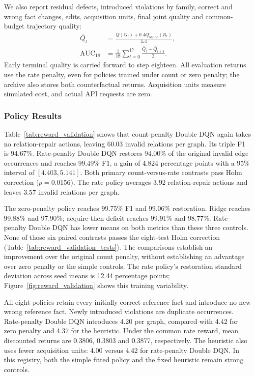 We also report residual defects, introduced violations by family, correct and wrong fact changes, edits, acquisition units, final joint quality and common-budget trajectory quality:
\begin{equation}
\begin{aligned}
\bar Q_t&=\frac{Q(G_t)+0.4Q_{\mathrm{online}}(R_t)}{1.4},\\
\mathrm{AUC}_{18}&=\frac1{18}\sum_{t=0}^{17}\frac{\bar Q_t+\bar Q_{t+1}}2.
\end{aligned}
\end{equation}
Early terminal quality is carried forward to step eighteen. All evaluation returns use the rate penalty, even for policies trained under count or zero penalty; the archive also stores both counterfactual returns. Acquisition units measure simulated cost, and actual API requests are zero.




\subsubsection{Policy Results}
Table~\ref{tab:reward_validation} shows that count-penalty Double DQN again takes no relation-repair actions, leaving 60.03 invalid relations per graph. Its triple F1 is 94.67\%. Rate-penalty Double DQN restores 94.00\% of the original invalid edge occurrences and reaches 99.49\% F1, a gain of 4.824 percentage points with a 95\% interval of $[4.403,5.141]$. Both primary count-versus-rate contrasts pass Holm correction ($p=0.0156$). The rate policy averages 3.92 relation-repair actions and leaves 3.57 invalid relations per graph.

The zero-penalty policy reaches 99.75\% F1 and 99.06\% restoration. Ridge reaches 99.88\% and 97.90\%; acquire-then-deficit reaches 99.91\% and 98.77\%. Rate-penalty Double DQN has lower means on both metrics than these three controls. None of those six paired contrasts passes the eight-test Holm correction (Table~\ref{tab:reward_validation_tests}). The comparisons establish an improvement over the original count penalty, without establishing an advantage over zero penalty or the simple controls. The rate policy's restoration standard deviation across seed means is 12.44 percentage points; Figure~\ref{fig:reward_validation} shows this training variability.

All eight policies retain every initially correct reference fact and introduce no new wrong reference fact. Newly introduced violations are duplicate occurrences. Rate-penalty Double DQN introduces 4.20 per graph, compared with 4.42 for zero penalty and 4.37 for the heuristic. Under the common rate reward, mean discounted returns are 0.3806, 0.3803 and 0.3877, respectively. The heuristic also uses fewer acquisition units: 4.00 versus 4.42 for rate-penalty Double DQN. In this registry, both the simple fitted policy and the fixed heuristic remain strong controls.

